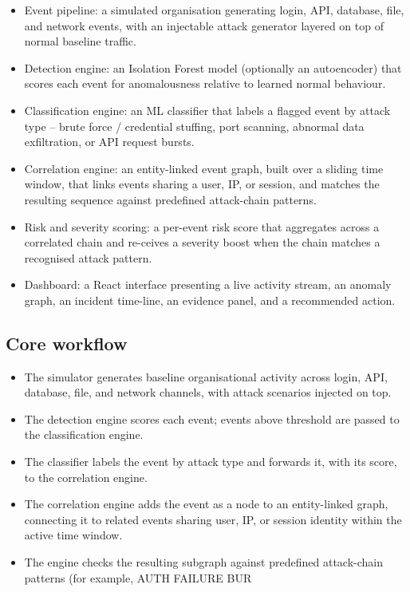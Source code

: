 \documentclass[12pt]{article}
\begin{document}
\begin{itemize}
  \item Event pipeline: a simulated organisation generating login, API, database, file, and network events, with an injectable attack generator layered on top of normal baseline traffic.
  \item Detection engine: an Isolation Forest model (optionally an autoencoder) that scores each event for anomalousness relative to learned normal behaviour.
  \item Classification engine: an ML classifier that labels a flagged event by attack type -- brute force / credential stuffing, port scanning, abnormal data exfiltration, or API request bursts.
  \item Correlation engine: an entity-linked event graph, built over a sliding time window, that links events sharing a user, IP, or session, and matches the resulting sequence against predefined attack-chain patterns.
  \item Risk and severity scoring: a per-event risk score that aggregates across a correlated chain and re-ceives a severity boost when the chain matches a recognised attack pattern.
  \item Dashboard: a React interface presenting a live activity stream, an anomaly graph, an incident time-line, an evidence panel, and a recommended action.
\end{itemize}

\subsection{Core workflow}

\begin{itemize}
  \item The simulator generates baseline organisational activity across login, API, database, file, and network channels, with attack scenarios injected on top.
  \item The detection engine scores each event; events above threshold are passed to the classification engine.
  \item The classifier labels the event by attack type and forwards it, with its score, to the correlation engine.
  \item The correlation engine adds the event as a node to an entity-linked graph, connecting it to related events sharing user, IP, or session identity within the active time window.
  \item The engine checks the resulting subgraph against predefined attack-chain patterns (for example, AUTH FAILURE BUR
\end{itemize}
\end{document}

